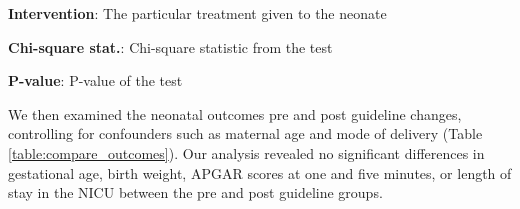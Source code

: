 \documentclass[11pt]{article}
\begin{document}
\begin{table}[h]
\caption{Comparison of Interventions Pre and Post Guideline Changes}
\label{table:compare_interventions}
\begin{threeparttable}
\renewcommand{\TPTminimum}{\linewidth}
\begin{tablenotes}
\footnotesize
\item \textbf{Intervention}: The particular treatment given to the neonate
\item \textbf{Chi-square stat.}: Chi-square statistic from the test
\item \textbf{P-value}: P-value of the test
\end{tablenotes}
\end{threeparttable}
\end{table}


We then examined the neonatal outcomes pre and post guideline changes, controlling for confounders such as maternal age and mode of delivery (Table {}\ref{table:compare_outcomes}). Our analysis revealed no significant differences in gestational age, birth weight, APGAR scores at one and five minutes, or length of stay in the NICU between the pre and post guideline groups. 
\end{document}
